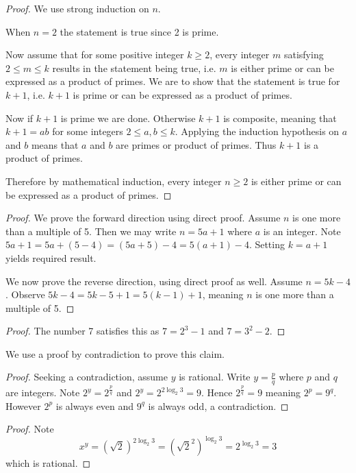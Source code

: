 \begin{questions}
    \item \begin{proof}
        We use strong induction on $n$.

        When $n = 2$ the statement is true since 2 is prime.

        Now assume that for some positive integer $k \geq 2$, every integer $m$ satisfying $2 \leq m \leq k$ results in the statement being true, i.e. $m$ is either prime or can be expressed as a product of primes. We are to show that the statement is true for $k + 1$, i.e. $k+1$ is prime or can be expressed as a product of primes.

        Now if $k + 1$ is prime we are done. Otherwise $k + 1$ is composite, meaning that $k + 1 = ab$ for some integers $2 \leq a,b \leq k$. Applying the induction hypothesis on $a$ and $b$ means that $a$ and $b$ are primes or product of primes. Thus $k + 1$ is a product of primes.

        Therefore by mathematical induction, every integer $n \geq 2$ is either prime or can be expressed as a product of primes.
    \end{proof}

    \item \begin{proof}
        We prove the forward direction using direct proof. Assume $n$ is one more than a multiple of 5. Then we may write $n = 5a + 1$ where $a$ is an integer. Note $5a + 1 = 5a + (5 - 4) = (5a + 5) - 4 = 5(a+1) - 4$. Setting $k = a+1$ yields required result.

        We now prove the reverse direction, using direct proof as well. Assume $n = 5k - 4$. Observe $5k - 4 = 5k - 5 + 1 = 5(k-1) + 1$, meaning $n$ is one more than a multiple of 5.
    \end{proof}

    \item \begin{proof}
        The number 7 satisfies this as $7 = 2^3 - 1$ and $7 = 3^2 - 2$.
    \end{proof}

    \item \begin{partquestions}{\roman*}
        \item We use a proof by contradiction to prove this claim.

        \begin{proof}
            Seeking a contradiction, assume $y$ is rational. Write $y = \frac pq$ where $p$ and $q$ are integers. Note $2^y = 2^{\frac pq}$ and $2^y = 2^{2\log_2{3}} = 9$. Hence $2^{\frac pq} = 9$ meaning $2^p = 9^q$. However $2^p$ is always even and $9^q$ is always odd, a contradiction.
        \end{proof}

        \item \begin{proof}
            Note
            \[
                x^y = (\sqrt2)^{2\log_2{3}} = \left(\sqrt{2}^2\right)^{\log_2{3}} = 2^{\log_2{3}} = 3
            \]
            which is rational.
        \end{proof}
    \end{partquestions}
\end{questions}
